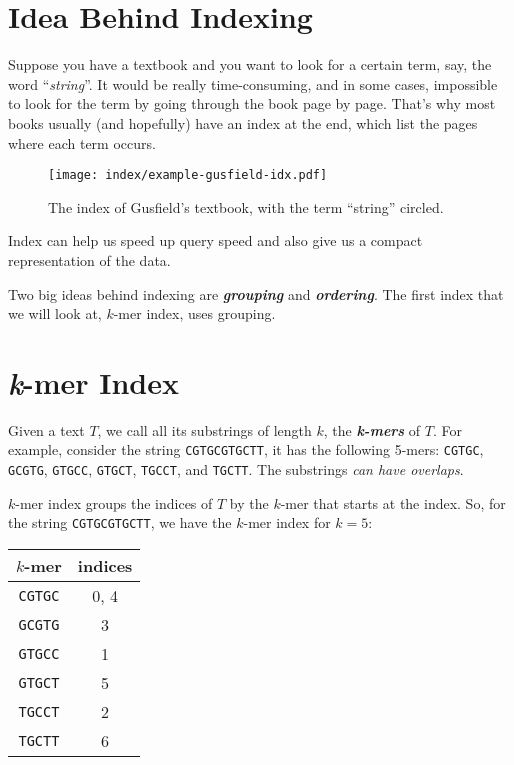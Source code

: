 \section{Idea Behind Indexing}

Suppose you have a textbook and you want to look for a certain term, say, the word ``\textit{string}''. It would be really time-consuming, and in some cases, impossible to look for the term by going through the book page by page. That's why most books usually (and hopefully) have an index at the end, which list the pages where each term occurs.

\begin{figure}
    \centering
    \texttt{[image: index/example-gusfield-idx.pdf]}
    \label{fig:example-gusfield-idx}
    \caption{The index of Gusfield's textbook, with the term ``string'' circled.}
\end{figure}

Index can help us speed up query speed and also give us a compact representation of the data.

Two big ideas behind indexing are \textit{\textbf{grouping}} and \textit{\textbf{ordering}}. The first index that we will look at, $k$-mer index, uses grouping.

\section{\textit{k}-mer Index}

Given a text $T$, we call all its substrings of length $k$, the \textit{\textbf{k-mers}} of $T$. For example, consider the string \texttt{CGTGCGTGCTT}, it has the following 5-mers: \texttt{CGTGC}, \texttt{GCGTG}, \texttt{GTGCC}, \texttt{GTGCT}, \texttt{TGCCT}, and \texttt{TGCTT}. The substrings \textit{can have overlaps}.

$k$-mer index groups the indices of $T$ by the $k$-mer that starts at the index. So, for the string \texttt{CGTGCGTGCTT}, we have the $k$-mer index for $k=5$:

\begin{table}
    \centering
    \begin{tabular}[H]{c|c}
        $k$-mer & indices \\
        \hline
        \texttt{CGTGC} & 0, 4 \\
        \texttt{GCGTG} & 3 \\
        \texttt{GTGCC} & 1 \\
        \texttt{GTGCT} & 5 \\
        \texttt{TGCCT} & 2 \\
        \texttt{TGCTT} & 6
    \end{tabular}
\end{table}

